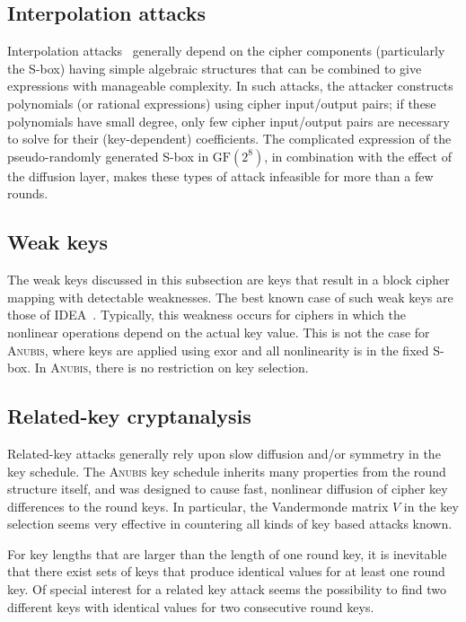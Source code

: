 \documentclass{llncs}
\newcommand{\GF}{\mathrm{GF}}
\begin{document}
\subsection{Interpolation attacks}

Interpolation attacks~\cite{interpolation} generally depend on the
cipher components (particularly the S-box) having simple
algebraic structures that can be combined to give expressions
with manageable complexity. In such attacks, the attacker
constructs polynomials (or rational expressions) using cipher
input/output pairs; if these polynomials have small degree, only
few cipher input/output pairs are necessary to solve for their
(key-dependent) coefficients. The complicated expression of the
pseudo-randomly generated S-box in $\GF(2^8)$, in combination with
the effect of the diffusion layer, makes these types of attack
infeasible for more than a few rounds.

\subsection{Weak keys}

The weak keys discussed in this subsection are keys that result
in a block cipher mapping with detectable weaknesses. The best
known case of such weak keys are those of IDEA~\cite{joan}.
Typically, this weakness occurs for ciphers in which the
nonlinear operations depend on the actual key value. This is not
the case for \textsc{Anubis}, where keys are applied using exor
and all nonlinearity is in the fixed S-box. In \textsc{Anubis},
there is no restriction on key selection.

\subsection{Related-key cryptanalysis}

Related-key attacks generally rely upon slow diffusion and/or
symmetry in the key schedule. The \textsc{Anubis} key schedule
inherits many properties from the round structure itself, and was
designed to cause fast, nonlinear diffusion of cipher key
differences to the round keys. In particular, the Vandermonde
matrix $V$ in the key selection seems very effective in countering
all kinds of key based attacks known.

For key lengths that are larger than the length
of one round key, it is inevitable that there exist sets of keys
that produce identical values for at least one round key. Of special
interest for a related key attack seems the possibility to find
two different keys with identical values for two consecutive
round keys.
\end{document}
